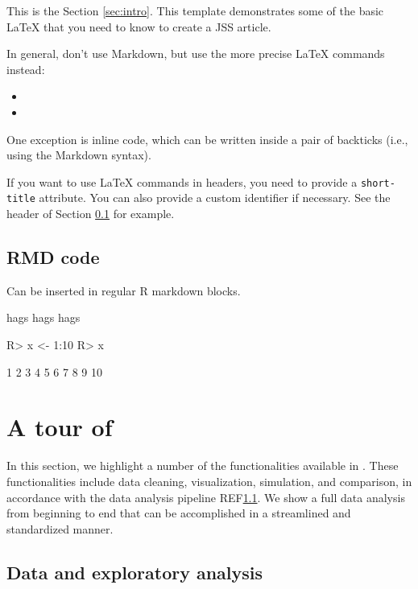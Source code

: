 \documentclass[
  shortnames]{jss}
\begin{document}
This is the Section \ref{sec:intro}. This template demonstrates some of
the basic LaTeX that you need to know to create a JSS article.

In general, don't use Markdown, but use the more precise LaTeX commands
instead:

\begin{itemize}
\item
\item
\end{itemize}

One exception is inline code, which can be written inside a pair of
backticks (i.e., using the Markdown syntax).

If you want to use LaTeX commands in headers, you need to provide a
\texttt{short-title} attribute. You can also provide a custom identifier
if necessary. See the header of Section \ref{r-code} for example.

\subsection[R code]{RMD  code}\label{r-code}

Can be inserted in regular R markdown blocks.

hags hags hags \cite{Neal2004}

\begin{CodeChunk}
\begin{CodeInput}
R> x <- 1:10
R> x
\end{CodeInput}
\begin{CodeOutput}
 [1]  1  2  3  4  5  6  7  8  9 10
\end{CodeOutput}
\end{CodeChunk}

\section[Tour]{A tour of }\label{sec:tour}

In this section, we highlight a number of the functionalities available
in . These functionalities include data cleaning,
visualization, simulation, and comparison, in accordance with the data
analysis pipeline REF\ref{}. We show a full data analysis from beginning
to end that can be accomplished in a streamlined and standardized
manner.

\subsection{Data and exploratory analysis}
\end{document}
